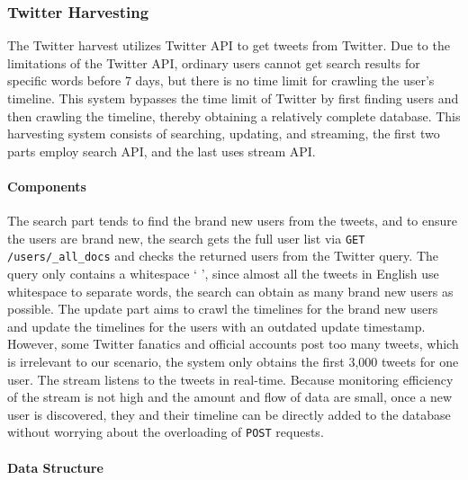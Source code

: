 \subsubsection{Twitter Harvesting}

The Twitter harvest utilizes Twitter API to get tweets from Twitter. Due to the limitations of the Twitter API, ordinary users cannot get search results for specific words before 7 days, but there is no time limit for crawling the user's timeline. This system bypasses the time limit of Twitter by first finding users and then crawling the timeline, thereby obtaining a relatively complete database. This harvesting system consists of searching, updating, and streaming, the first two parts employ search API, and the last uses stream API.

\paragraph{Components}
The search part tends to find the brand new users from the tweets, and to ensure the users are brand new, the search gets the full user list via \texttt{GET /users/_all_docs} and checks the returned users from the Twitter query.  The query only contains a whitespace ‘ ’, since almost all the tweets in English use whitespace to separate words, the search can obtain as many brand new users as possible. The update part aims to crawl the timelines for the brand new users and update the timelines for the users with an outdated update timestamp. However, some Twitter fanatics and official accounts post too many tweets, which is irrelevant to our scenario, the system only obtains the first 3,000 tweets for one user. The stream listens to the tweets in real-time. Because monitoring efficiency of the stream is not high and the amount and flow of data are small, once a new user is discovered, they and their timeline can be directly added to the database without worrying about the overloading of \texttt{POST} requests.

\paragraph{Data Structure}

